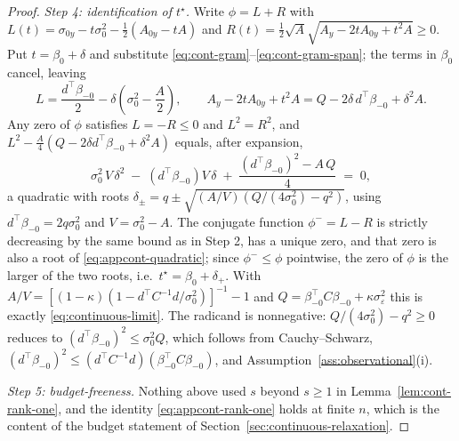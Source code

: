 \begin{proof}
{\emph{Step 4: identification of $t^\star$.} Write
$\phi = L + R$ with
$L(t) = \sigma_{0y} - t\sigma_0^2 - \tfrac12 (A_{0y} - tA)$ and
$R(t) = \tfrac12 \sqrt{A}\sqrt{A_y - 2tA_{0y} + t^2A} \ge 0$. Put
$t = \beta_0 + \delta$ and substitute
\eqref{eq:cont-gram}--\eqref{eq:cont-gram-span}; the terms in $\beta_0$
cancel, leaving
\begin{equation}\label{eq:appcont-recentre}
        L = \frac{d^\top \beta_{-0}}{2} - \delta \left( \sigma_0^2
        - \frac A2 \right),
        \qquad
        A_y - 2 t A_{0y} + t^2 A
        = Q - 2 \delta\, d^\top \beta_{-0} + \delta^2 A .
\end{equation}
Any zero of $\phi$ satisfies $L = -R \le 0$ and $L^2 = R^2$, and
$L^2 - \tfrac{A}{4}(Q - 2\delta d^\top\beta_{-0} + \delta^2 A)$ equals,
after expansion,
\begin{equation}\label{eq:appcont-quadratic}
        \sigma_0^2\, V\, \delta^2
        \;-\; \left( d^\top \beta_{-0} \right) V\, \delta
        \;+\; \frac{ \left( d^\top \beta_{-0} \right)^2 - A\, Q }{4}
        \;=\; 0 ,
\end{equation}
a quadratic with roots
$\delta_\pm = q \pm \sqrt{(A/V) \left( Q/(4\sigma_0^2) - q^2 \right)}$,
using $d^\top \beta_{-0} = 2 q \sigma_0^2$ and $V = \sigma_0^2 - A$.
The conjugate function $\phi^- = L - R$ is strictly decreasing by the
same bound as in Step 2, has a unique zero, and that zero is also a root
of \eqref{eq:appcont-quadratic}; since $\phi^- \le \phi$ pointwise, the
zero of $\phi$ is the larger of the two roots, i.e.\
$t^\star = \beta_0 + \delta_+$. With
$A/V = \left[(1-\kappa)(1 - d^\top C^{-1} d / \sigma_0^2)\right]^{-1} - 1$
and $Q = \beta_{-0}^\top C \beta_{-0} + \kappa \sigma_\varepsilon^2$
this is exactly \eqref{eq:continuous-limit}. The radicand is
nonnegative: $Q/(4\sigma_0^2) - q^2 \ge 0$ reduces to
$(d^\top\beta_{-0})^2 \le \sigma_0^2 Q$, which follows from
Cauchy--Schwarz, $(d^\top \beta_{-0})^2 \le (d^\top C^{-1} d)
(\beta_{-0}^\top C \beta_{-0})$, and
Assumption~\ref{ass:observational}(i).

\emph{Step 5: budget-freeness.} Nothing above used $s$ beyond
$s \ge 1$ in Lemma~\ref{lem:cont-rank-one}, and the identity
\eqref{eq:appcont-rank-one} holds at finite $n$, which is the content of
the budget statement of Section~\ref{sec:continuous-relaxation}.}
\end{proof}

